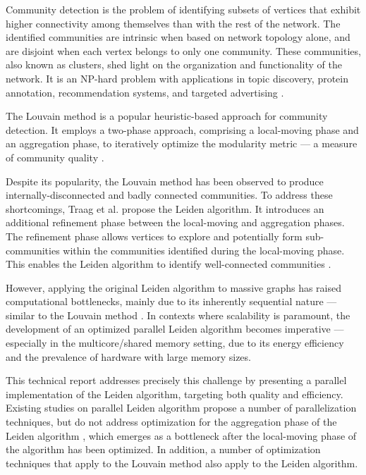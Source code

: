Community detection is the problem of identifying subsets of vertices that exhibit higher connectivity among themselves than with the rest of the network. The identified communities are intrinsic when based on network topology alone, and are disjoint when each vertex belongs to only one community. These communities, also known as clusters, shed light on the organization and functionality of the network. It is an NP-hard problem with applications in topic discovery, protein annotation, recommendation systems, and targeted advertising \cite{com-gregory10}. The Louvain method \cite{com-blondel08} is a popular heuristic-based approach for community detection. It employs a two-phase approach, comprising a local-moving phase and an aggregation phase, to iteratively optimize the modularity metric --- a measure of community quality \cite{com-newman06}.

Despite its popularity, the Louvain method has been observed to produce internally-disconnected and badly connected communities. To address these shortcomings, Traag et al. \cite{com-traag19} propose the Leiden algorithm. It introduces an additional refinement phase between the local-moving and aggregation phases. The refinement phase allows vertices to explore and potentially form sub-communities within the communities identified during the local-moving phase. This enables the Leiden algorithm to identify well-connected communities \cite{com-traag19}.

However, applying the original Leiden algorithm to massive graphs has raised computational bottlenecks, mainly due to its inherently sequential nature --- similar to the Louvain method \cite{com-halappanavar17}. In contexts where scalability is paramount, the development of an optimized parallel Leiden algorithm becomes imperative --- especially in the multicore/shared memory setting, due to its energy efficiency and the prevalence of hardware with large memory sizes.

This technical report addresses precisely this challenge by presenting a parallel implementation of the Leiden algorithm, targeting both quality and efficiency. Existing studies on parallel Leiden algorithm propose a number of parallelization techniques, but do not address optimization for the aggregation phase of the Leiden algorithm \cite{verweijfaster}, which emerges as a bottleneck after the local-moving phase of the algorithm has been optimized. In addition, a number of optimization techniques that apply to the Louvain method also apply to the Leiden algorithm.

